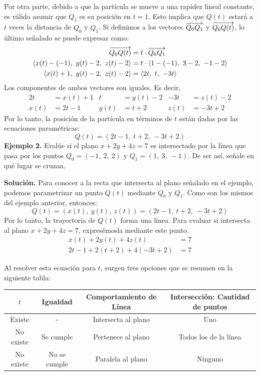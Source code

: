 \documentclass[12pt]{article}
\begin{document}
Por otra parte, debido a que la partícula se mueve a una rapidez lineal constante, es válido asumir que $Q_{1}$ es su posición en $t = 1$. Esto implica que $Q(t)$ estará a $t$ veces la distancia de $Q_{0}$ y $Q_{1}$. Si definimos a los vectores $\overrightarrow{Q_{0}Q_{1}}$ y $\overrightarrow{Q_{0}Q(t)}$, lo último señalado se puede expresar como:
\begin{align*}
  \overvec{Q_{0}Q(t)} &= t \cdot \overvec{Q_{0}Q_{1}} \\
  \langle x(t) - (-1), \ y(t) - 2, \ z(t) - 2 \rangle &= t \cdot \langle 1 - (-1), \ 3 - 2, \ - 1 - 2 \rangle \\
  \langle x(t) + 1, \ y(t) - 2, \ z(t) - 2 \rangle &= \langle 2t, \ t, \ -3t \rangle
\end{align*}
Los componentes de ambos vectores son iguales. Es decir,
\begin{align*}
2t &= x(t) + 1 & t &= y(t) - 2 & -3t &= z(t) - 2 \\
x(t) &= 2t - 1 & y(t) &= t + 2 & z(t) &= -3t + 2
\end{align*}
Por lo tanto, la posición de la partícula en términos de $t$ están dadas por las ecuaciones paramétricas:
\[
  Q(t) = (2t - 1, \ t + 2, \ -3t + 2)
\]
\textbf{Ejemplo 2.} Evalúe si el plano $x + 2y + 4z = 7$ es intersectado por la línea que pasa por los puntos $Q_{0} = (-1, \ 2, \ 2)$ y $Q_{1} = (1, \ 3, \ -1)$. De ser así, señale en qué lugar se cruzan.

\textbf{Solución.} Para conocer a la recta que intersecta al plano señalado en el ejemplo, podemos parametrizar un punto $Q(t)$ mediante $Q_{0}$ y $Q_{1}$. Como son los mismos del ejemplo anterior, entonces:
\[
  Q(t) = (x(t), \ y(t), \ z(t)) = (2t - 1, \ t + 2, \ -3t + 2)
\]
Por lo tanto, la trayectoria de $Q(t)$ forma una linea. Para evaluar si intersecta al plano $x + 2y + 4z = 7$, expresémosla mediante este punto.
\begin{align*}
  x(t) + 2y(t) + 4z(t) &= 7 \\
  2t - 1 + 2(t + 2) + 4(-3t + 2) &= 7
\end{align*}

Al resolver esta ecuación para $t$, surgen tres opciones que se resumen en la siguiente tabla:

\begin{table}[hbt!]
\centering

\begin{tabular}{c c c c}
\hline
$t$ & Igualdad & Comportamiento de Línea & Intersección: Cantidad de puntos \\
\hline
Existe & - & Intersecta al plano & Uno \\
No existe & Se cumple & Pertenece al plano & Todos los de la línea \\
No existe & No se cumple & Paralela al plano & Ninguno \\
\hline
\end{tabular}

\end{table}
\end{document}
